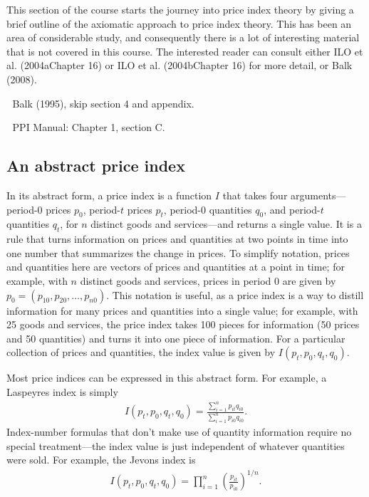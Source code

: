 \documentclass[
]{article}
\begin{document}
This section of the course starts the journey into price index theory by giving a brief outline of the axiomatic approach to price index theory. This has been an area of considerable study, and consequently there is a lot of interesting material that is not covered in this course. The interested reader can consult either ILO et al. (2004aChapter 16) or ILO et al. (2004bChapter 16) for more detail, or Balk (2008).

📖 Balk (1995), skip section 4 and appendix.

📖 PPI Manual: Chapter 1, section C.

\hypertarget{an-abstract-price-index}{%
\subsection{An abstract price index}\label{an-abstract-price-index}}

In its abstract form, a price index is a function \(I\) that takes four arguments---period-0 prices \(p_{0}\), period-\(t\) prices \(p_{t}\), period-0 quantities \(q_{0}\), and period-\(t\) quantities \(q_{t}\), for \(n\) distinct goods and services---and returns a single value. It is a rule that turns information on prices and quantities at two points in time into one number that summarizes the change in prices. To simplify notation, prices and quantities here are vectors of prices and quantities at a point in time; for example, with \(n\) distinct goods and services, prices in period 0 are given by \(p_0 = (p_{10}, p_{20}, \ldots, p_{n0})\). This notation is useful, as a price index is a way to distill information for many prices and quantities into a single value; for example, with 25 goods and services, the price index takes 100 pieces for information (50 prices and 50 quantities) and turns it into one piece of information. For a particular collection of prices and quantities, the index value is given by \(I(p_{t}, p_{0}, q_{t}, q_{0})\).

Most price indices can be expressed in this abstract form. For example, a Laspeyres index is simply
\begin{align*}
I(p_{t}, p_{0}, q_{t}, q_{0}) = \frac{\sum_{i=1}^{n} p_{it}q_{i0}}{\sum_{i=1}^{n} p_{i0}q_{i0}}.
\end{align*}
Index-number formulas that don't make use of quantity information require no special treatment---the index value is just independent of whatever quantities were sold. For example, the Jevons index is
\begin{align*}
I(p_{t}, p_{0}, q_{t}, q_{0}) = \prod_{i=1}^{n} \left(\frac{p_{it}}{p_{i0}}\right)^{1 / n}.
\end{align*}
\end{document}
